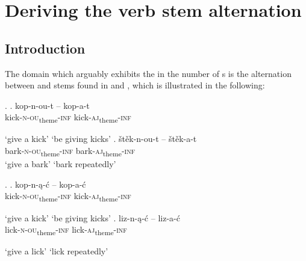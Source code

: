 \chapter{Deriving the verb stem alternation}\label{chapter:explaining}


\section{Introduction}

The domain which arguably exhibits the  in the number of s is the alternation between   and   stems found in  and , which is illustrated in the following: 


\ex.  \label{Cz:sem-act}
\ag. 
kop-n-ou-t -- kop-a-t\\
kick-\textsc{n-ou}\textsubscript{theme}-\textsc{inf} {} kick-\textsc{aj}\textsubscript{theme}-\textsc{inf}\\
\strut `give a kick' \hskip 1.4cm `be giving kicks'
\bg.
\v{s}t\v{e}k-n-ou-t -- \v{s}t\v{e}k-a-t\\
bark-\textsc{n-ou}\textsubscript{theme}-\textsc{inf} {} bark-\textsc{aj}\textsubscript{theme}-\textsc{inf}\\
`give a bark' \hskip 1.45cm `bark repeatedly'

\ex. \label{P:sem-act}
\ag. 
kop-n-\k{a}-\'c -- kop-a-\'c\\
kick-\textsc{n-ou}\textsubscript{theme}-\textsc{inf} {} kick-\textsc{aj}\textsubscript{theme}-\textsc{inf}\\
\strut `give a kick' \hskip 1.4cm `be giving kicks'
\bg. 
liz-n-\k{a}-\'c -- liz-a-\'c\\
lick-\textsc{n-ou}\textsubscript{theme}-\textsc{inf} {} lick-\textsc{aj}\textsubscript{theme}-\textsc{inf}\\
\strut `give a lick' \hskip 1.4cm `lick repeatedly'

